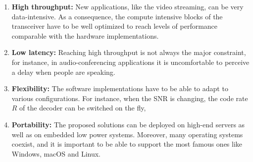 \begin{enumerate}
  \item \textbf{High throughput:} New applications, like the video streaming,
    can be very data-intensive. As a consequence, the compute intensive blocks
    of the transceiver have to be well optimized to reach levels of performance
    comparable with the hardware implementations.
  \item \textbf{Low latency:} Reaching high throughput is not always the major
    constraint, for instance, in audio-conferencing applications it is
    uncomfortable to perceive a delay when people are speaking.
  \item \textbf{Flexibility:} The software implementations have to be able to
    adapt to various configurations. For instance, when the SNR is changing,
    the code rate $R$ of the decoder can be switched on the fly,
  \item \textbf{Portability:} The proposed solutions can be deployed on high-end
    servers as well as on embedded low power systems. Moreover, many operating
    systems coexist, and it is important to be able to support the most famous
    ones like Windows, macOS and Linux.
\end{enumerate}




